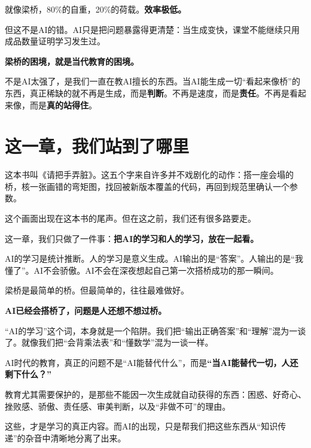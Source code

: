 就像梁桥，80\%的自重，20\%的荷载。\textbf{效率极低。}

但这不是AI的错。AI只是把问题暴露得更清楚：当生成变快，课堂不能继续只用成品数量证明学习发生过。

\begin{insight}
\label{insight:chap1-beam}

\textbf{梁桥的困境，就是当代教育的困境。}

不是AI太强了，是我们一直在教AI擅长的东西。当AI能生成一切“看起来像桥”的东西，真正稀缺的就不再是生成，而是\textbf{判断}。不再是速度，而是\textbf{责任}。不再是看起来像，而是\textbf{真的站得住}。
\end{insight}

\section{这一章，我们站到了哪里}

这本书叫《请把手弄脏》。这五个字来自许多并不戏剧化的动作：搭一座会塌的桥，核一张画错的弯矩图，找回被新版本覆盖的代码，再回到规范里确认一个参数。

这个画面出现在这本书的尾声。但在这之前，我们还有很多路要走。

这一章，我们只做了一件事：\textbf{把AI的学习和人的学习，放在一起看。}

AI的学习是统计推断。人的学习是意义生成。AI输出的是“答案”。人输出的是“我懂了”。AI不会骄傲。AI不会在深夜想起自己第一次搭桥成功的那一瞬间。

梁桥是最简单的桥。但最简单的，往往最难做好。

\begin{shiyu-note}
\label{note:chap1}

\textbf{AI已经会搭桥了，问题是人还想不想过桥。}

“AI的学习”这个词，本身就是一个陷阱。我们把“输出正确答案”和“理解”混为一谈了。就像我们把“会背乘法表”和“懂数学”混为一谈一样。

AI时代的教育，真正的问题不是“AI能替代什么”，而是\textbf{“当AI能替代一切，人还剩下什么？”}

教育尤其需要保护的，是那些不能因一次生成就自动获得的东西：困惑、好奇心、挫败感、骄傲、责任感、审美判断，以及“非做不可”的理由。

这些，才是学习的真正内容。而AI的出现，只是帮我们把这些东西从“知识传递”的杂音中清晰地分离了出来。
\end{shiyu-note}

\vspace{1cm}

